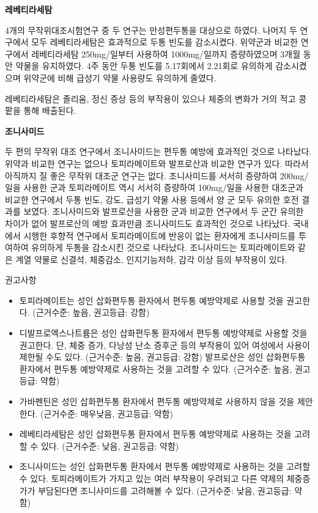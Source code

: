 \documentclass[]{book}
\begin{document}
\textbf{레베티라세탐}

4개의 무작위대조시험연구 중 두 연구는 만성편두통을 대상으로 하였다. 나머지 두 연구에서 모두 레베티라세탐은 효과적으로 두통 빈도를 감소시켰다. 위약군과 비교한 연구에서 레베티라세탐 250mg/일부터 사용하여 1000mg/일까지 증량하였으며 3개월 동안 약물을 유지하였다. 4주 동안 두통 빈도를 5.17회에서 2.21회로 유의하게 감소시켰으며 위약군에 비해 급성기 약물 사용량도 유의하게 줄였다.

레베티라세탐은 졸리움, 정신 증상 등의 부작용이 있으나 체중의 변화가 거의 적고 콩팥을 통해 배출된다.

\textbf{조니사미드}

두 편의 무작위 대조 연구에서 조니사미드는 편두통 예방에 효과적인 것으로 나타났다. 위약과 비교한 연구는 없으나 토피라메이트와 발프로산과 비교한 연구가 있다. 따라서 아직까지 질 좋은 무작위 대조군 연구는 없다.
조니사미드를 서서히 증량하여 200mg/일을 사용한 군과 토피라메이트 역시 서서히 증량하여 100mg/일을 사용한 대조군과 비교한 연구에서 두통 빈도, 강도, 급성기 약물 사용 등에서 양 군 모두 유의한 호전 결과를 보였다. 조니사미드와 발프로산을 사용한 군과 비교한 연구에서 두 군간 유의한 차이가 없어 발프로산의 예방 효과만큼 조니사미드도 효과적인 것으로 나타났다. 국내에서 시행한 후향적 연구에서 토피라메이트에 반응이 없는 환자에게 조니사미드를 투여하여 유의하게 두통을 감소시킨 것으로 나타났다. 조니사미드는 토피라메이트와 같은 계열 약물로 신결석, 체중감소, 인지기능저하, 감각 이상 등의 부작용이 있다.

권고사항

\begin{itemize}
\item
  토피라메이트는 성인 삽화편두통 환자에서 편두통 예방약제로 사용할 것을 권고한다. (근거수준: 높음, 권고등급: 강함)
\item
  디발프로엑스나트륨은 성인 삽화편두통 환자에서 편두통 예방약제로 사용할 것을 권고한다. 단, 체중 증가, 다낭성 난소 증후군 등의 부작용이 있어 여성에서 사용이 제한될 수도 있다. (근거수준: 높음, 권고등급: 강함) 발프로산은 성인 삽화편두통 환자에서 편두통 예방약제로 사용하는 것을 고려할 수 있다. (근거수준: 높음, 권고등급: 약함)
\item
  가바펜틴은 성인 삽화편두통 환자에서 편두통 예방약제로 사용하지 않을 것을 제안한다. (근거수준: 매우낮음, 권고등급: 약함)
\item
  레베티라세탐은 성인 삽화편두통 환자에서 편두통 예방약제로 사용하는 것을 고려할 수 있다. (근거수준: 낮음, 권고등급: 약함)
\item
  조니사미드는 성인 삽화편두통 환자에서 편두통 예방약제로 사용하는 것을 고려할 수 있다. 토피라메이트가 가지고 있는 여러 부작용이 우려되고 다른 약제의 체중증가가 부담된다면 조니사미드를 고려해볼 수 있다. (근거수준: 낮음, 권고등급: 약함)
\end{itemize}
\end{document}
